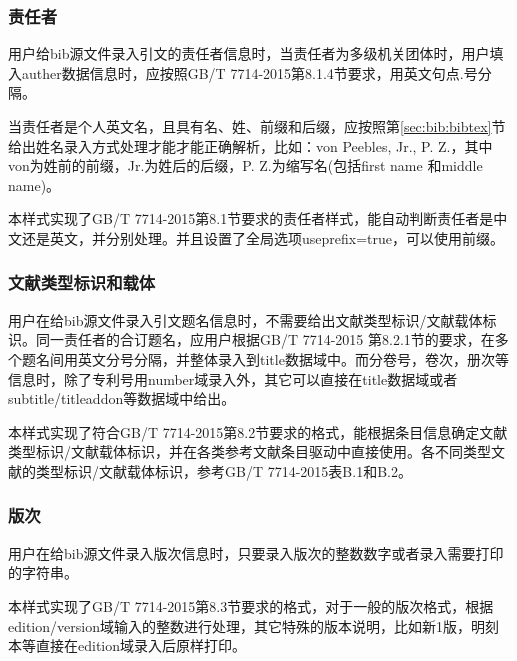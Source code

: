 \subsubsection{责任者}

\begin{property}{}{}
用户给bib源文件录入引文的责任者信息时，当责任者为多级机关团体时，用户填入auther数据信息时，应按照GB/T 7714-2015第8.1.4节要求，用英文句点.号分隔。

当责任者是个人英文名，且具有名、姓、前缀和后缀，应按照第\ref{sec:bib:bibtex}节给出姓名录入方式处理才能才能正确解析，比如：von Peebles, Jr., P. Z.，其中von为姓前的前缀，Jr.为姓后的后缀，P. Z.为缩写名(包括first name 和middle name)。

本样式实现了GB/T 7714-2015第8.1节要求的责任者样式，能自动判断责任者是中文还是英文，并分别处理。并且设置了全局选项useprefix=true，可以使用前缀。
\end{property}

\subsubsection{文献类型标识和载体}

\begin{property}{}{}
用户在给bib源文件录入引文题名信息时，不需要给出文献类型标识/文献载体标识。同一责任者的合订题名，应用户根据GB/T 7714-2015 第8.2.1节的要求，在多个题名间用英文分号分隔，并整体录入到title数据域中。而分卷号，卷次，册次等信息时，除了专利号用number域录入外，其它可以直接在title数据域或者subtitle/titleaddon等数据域中给出。

本样式实现了符合GB/T 7714-2015第8.2节要求的格式，能根据条目信息确定文献类型标识/文献载体标识，并在各类参考文献条目驱动中直接使用。各不同类型文献的类型标识/文献载体标识，参考GB/T 7714-2015表B.1和B.2。
\end{property}

\subsubsection{版次}\label{sec:fmt:edition}

\begin{property}{}{}
用户在给bib源文件录入版次信息时，只要录入版次的整数数字或者录入需要打印的字符串。

本样式实现了GB/T 7714-2015第8.3节要求的格式，对于一般的版次格式，根据edition/version域输入的整数进行处理，其它特殊的版本说明，比如新1版，明刻本等直接在edition域录入后原样打印。
\end{property}

